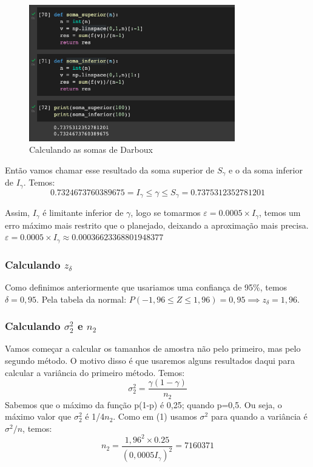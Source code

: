 \documentclass{article}
\begin{document}
\begin{figure}[ht]
\centering
\includegraphics[width=0.8\textwidth]{somaspy.png}
\caption{\label{fig:somaspy} Calculando as somas de Darboux }
\end{figure}
Então vamos chamar esse resultado da soma superior de $S_\gamma$ e o da soma inferior de $I_\gamma$. Temos:
\[
0.7324673760389675 = I_\gamma \leq \gamma \leq S_\gamma = 0.7375312352781201 
\]

Assim, $I_\gamma $ é limitante inferior de $\gamma$, logo se tomarmos $\varepsilon = 0.0005 \times I_\gamma$, temos um erro máximo mais restrito que o planejado, deixando a aproximação mais precisa. \\
$\varepsilon = 0.0005 \times I_\gamma \approx 0.00036623368801948377$



\subsubsection{Calculando $z_\delta$}
Como definimos anteriormente que usariamos uma confiança de 95\%, temos $\delta = 0,95$. Pela tabela da normal: $P(-1,96 \leq Z \leq 1,96) = 0,95 \implies z_\delta = 1,96$.

\subsubsection{Calculando $\sigma^2_2$ e $n_2$}
Vamos começar a calcular os tamanhos de amostra não pelo primeiro, mas pelo segundo método. O motivo disso é que usaremos alguns resultados daqui para calcular a variância do primeiro método. Temos:
\[
\sigma^2_2 = \frac{\gamma(1 - \gamma)}{n_2}
\]
Sabemos que o máximo da função p(1-p) é 0,25; quando p=0,5. Ou seja, o máximo valor que $\sigma^2_2$ é 1/4$n_2$. Como em (1) usamos $\sigma^2$ para quando a variância é $\sigma^2 /n$, temos:
\[
n_2 =  \frac{1,96^2 \times 0.25}{(0,0005 I_\gamma)^2} = 7160371
\]
\end{document}
